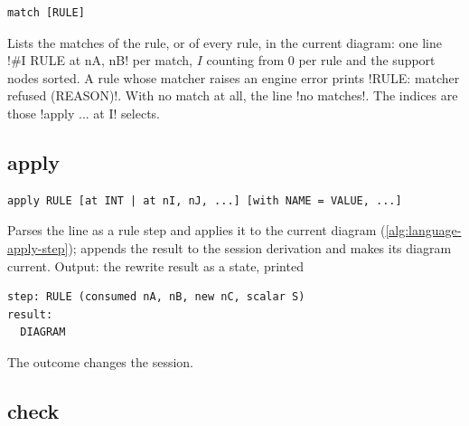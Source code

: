 \begin{lstlisting}[style=azx]
match [RULE]
\end{lstlisting}
Lists the matches of the rule, or of every rule, in the current diagram: one line \code!#I RULE at nA, nB! per match, $I$ counting from $0$ per rule and the support nodes sorted. A rule whose matcher raises an engine error prints \code!RULE: matcher refused (REASON)!. With no match at all, the line \code!no matches!. The indices are those \azx!apply ... at I! selects.

\subsection{apply}\label{sec:language-apply}

\begin{lstlisting}[style=azx]
apply RULE [at INT | at nI, nJ, ...] [with NAME = VALUE, ...]
\end{lstlisting}
Parses the line as a rule step and applies it to the current diagram (\cref{alg:language-apply-step}); appends the result to the session derivation and makes its diagram current. Output: the rewrite result as a state, printed
\begin{lstlisting}[style=grammar]
step: RULE (consumed nA, nB, new nC, scalar S)
result:
  DIAGRAM
\end{lstlisting}
The outcome changes the session.

\subsection{check}\label{sec:language-check}


